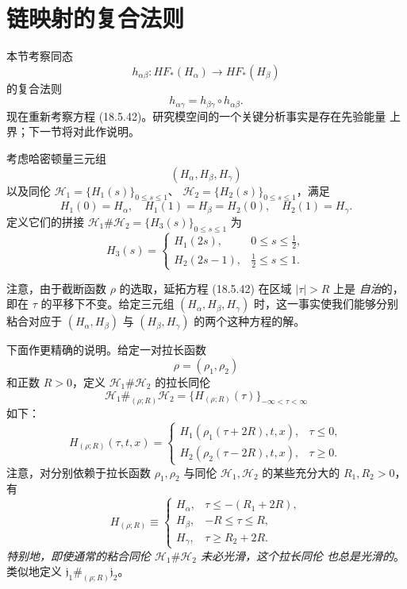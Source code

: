 \section{\personFloer{}链映射的复合法则}
\label{sec:composition-law-floer-chain-maps}

本节考察\personFloer{}同态
\begin{equation}
 h_{\alpha\beta}:HF_*(H_\alpha)\longrightarrow HF_*(H_\beta)
\label{eq:19-floer-homology-continuation-map}
\end{equation}
的复合法则
\[
 h_{\alpha\gamma}=h_{\beta\gamma}\circ h_{\alpha\beta}.
\]
现在重新考察方程 (18.5.42)。研究\personFloer{}模空间的一个关键分析事实是存在先验能量
上界；下一节将对此作说明。

考虑哈密顿量三元组
\[
 (H_\alpha,H_\beta,H_\gamma)
\]
以及同伦 $\mathcal H_1=\{H_1(s)\}_{0\leq s\leq1}$、
$\mathcal H_2=\{H_2(s)\}_{0\leq s\leq1}$，满足
\[
 H_1(0)=H_\alpha,\quad H_1(1)=H_\beta=H_2(0),\quad H_2(1)=H_\gamma.
\]
定义它们的拼接
$\mathcal H_1\#\mathcal H_2=\{H_3(s)\}_{0\leq s\leq1}$ 为
\[
 H_3(s)=
 \begin{cases}
  H_1(2s),&0\leq s\leq\frac12,\\
  H_2(2s-1),&\frac12\leq s\leq1.
 \end{cases}
\]

注意，由于截断函数 $\rho$ 的选取，延拓方程 (18.5.42) 在区域 $|\tau|>R$ 上是
\emph{自治}的，即在 $\tau$ 的平移下不变。给定三元组
$(H_\alpha,H_\beta,H_\gamma)$ 时，这一事实使我们能够分别粘合对应于
$(H_\alpha,H_\beta)$ 与 $(H_\beta,H_\gamma)$ 的两个这种方程的解。

下面作更精确的说明。给定一对拉长函数
\[
 \rho=(\rho_1,\rho_2)
\]
和正数 $R>0$，定义 $\mathcal H_1\#\mathcal H_2$ 的拉长同伦
\[
 \mathcal H_1\#_{(\rho;R)}\mathcal H_2
 =\{H_{(\rho;R)}(\tau)\}_{-\infty<\tau<\infty}
\]
如下：
\[
 H_{(\rho;R)}(\tau,t,x)=
 \begin{cases}
 H_1(\rho_1(\tau+2R),t,x),&\tau\leq0,\\
 H_2(\rho_2(\tau-2R),t,x),&\tau\geq0.
 \end{cases}
\]
注意，对分别依赖于拉长函数 $\rho_1,\rho_2$ 与同伦
$\mathcal H_1,\mathcal H_2$ 的某些充分大的 $R_1,R_2>0$，有
\[
 H_{(\rho;R)}\equiv
 \begin{cases}
 H_\alpha,&\tau\leq-(R_1+2R),\\
 H_\beta,&-R\leq\tau\leq R,\\
 H_\gamma,&\tau\geq R_2+2R.
 \end{cases}
\]
\emph{特别地，即使通常的粘合同伦 $\mathcal H_1\#\mathcal H_2$ 未必光滑，这个拉长同伦
也总是光滑的}。类似地定义 $\mathfrak j_1\#_{(\rho;R)}\mathfrak j_2$。

